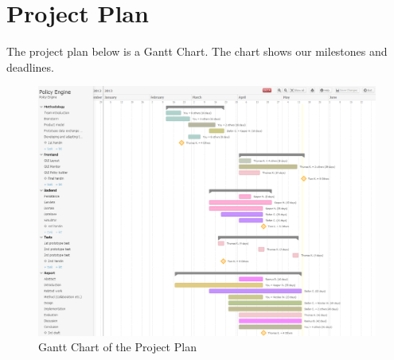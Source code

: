 \section{Project Plan} \label{sec:project-plan}
The project plan below is a Gantt Chart. The chart shows our milestones and deadlines.
\begin{figure}[ht!]
\centering
\includegraphics[width=\columnwidth, angle=270]{images/gantt-chart.png}
\caption{Gantt Chart of the Project Plan}
\label{fig:gantt-chart}
\end{figure}